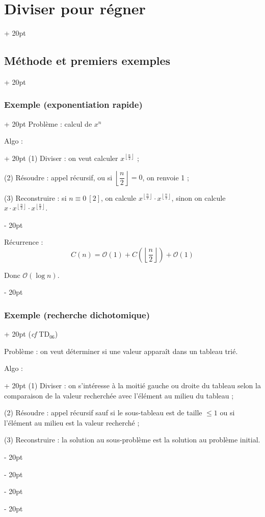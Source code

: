 \documentclass[a4paper, 12pt, twoside]{article}
\newcommand{\lr}[1]{\left( #1 \right)}
\newcommand{\floor}[1]{\left\lfloor #1 \right\rfloor}
\renewcommand{\le}{\leqslant}
\newcommand{\ind}[1][20pt]{\advance\leftskip + #1}
\newcommand{\deind}[1][20pt]{\advance\leftskip - #1}
\newenvironment{indt}[2][20pt]{#2 \par \ind[#1]}{\par \deind} %
\begin{document}
\begin{indt}{\section{Diviser pour régner}}
\begin{indt}{\subsection{Méthode et premiers exemples}}
\begin{indt}{\subsubsection{Exemple (exponentiation rapide)}}
                Problème : calcul de $x^n$
                
                \begin{indt}{Algo :}
                    (1) Diviser : on veut calculer $x^{\floor{\frac n 2}}$ ;
                    
                    (2) Résoudre : appel récursif, ou si $\floor{\dfrac n 2} = 0$, on renvoie 1 ;
                    
                    (3) Reconstruire : si $n \equiv 0\ [2]$, on calcule $x^{\floor{\frac n 2}} \cdot x^{\floor{\frac n 2}}$, sinon on calcule $x \cdot x^{\floor{\frac n 2}} \cdot x^{\floor{\frac n 2}}$.
                \end{indt}
                
                \vspace{6pt}
                
                Récurrence :
                    \[ C(n) = \mathcal O(1) + C\lr{\floor{\dfrac n 2}} + \mathcal O(1) \]
                
                Donc $\mathcal O(\log n)$.
            \end{indt}
            
            \vspace{12pt}
            
            \begin{indt}{\subsubsection{Exemple (recherche dichotomique)}}
                (\textit{cf} TD$_{06}$)
                
                Problème : on veut déterminer si une valeur apparaît dans un tableau trié.
                
                \begin{indt}{Algo :}
                    (1) Diviser : on s'intéresse à la moitié gauche ou droite du tableau selon la comparaison de la valeur recherchée avec l'élément au milieu du tableau ;
                    
                    (2) Résoudre : appel récursif sauf si le sous-tableau est de taille $\le 1$ ou si l'élément au milieu est la valeur recherché ;
                    
                    (3) Reconstruire : la solution au sous-problème est la solution au problème initial.
                \end{indt}
                

\end{indt}
\end{indt}
\end{indt}
\end{document}
